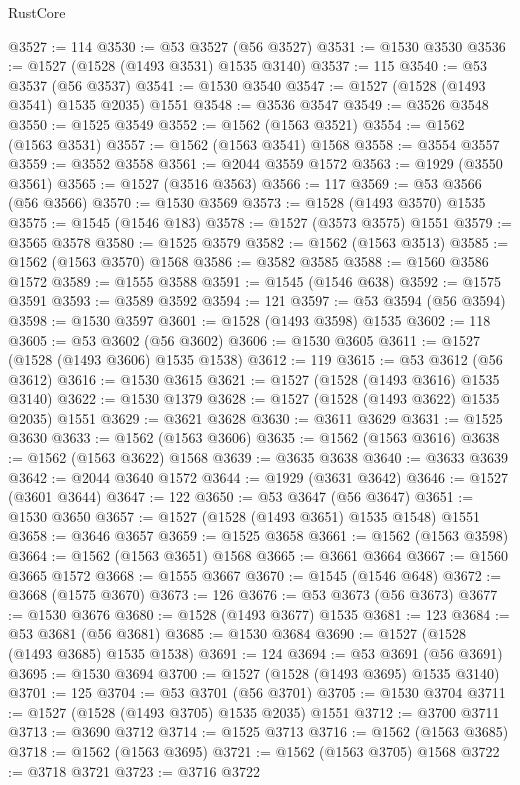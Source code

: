 \begin{lexlean}{RustCore}
\begin{coremodule}
@3527 := 114
@3530 := @53 @3527 (@56 @3527)
@3531 := @1530 @3530
@3536 := @1527 (@1528 (@1493 @3531) @1535 @3140)
@3537 := 115
@3540 := @53 @3537 (@56 @3537)
@3541 := @1530 @3540
@3547 := @1527 (@1528 (@1493 @3541) @1535 @2035) @1551
@3548 := @3536 @3547
@3549 := @3526 @3548
@3550 := @1525 @3549
@3552 := @1562 (@1563 @3521)
@3554 := @1562 (@1563 @3531)
@3557 := @1562 (@1563 @3541) @1568
@3558 := @3554 @3557
@3559 := @3552 @3558
@3561 := @2044 @3559 @1572
@3563 := @1929 (@3550 @3561)
@3565 := @1527 (@3516 @3563)
@3566 := 117
@3569 := @53 @3566 (@56 @3566)
@3570 := @1530 @3569
@3573 := @1528 (@1493 @3570) @1535
@3575 := @1545 (@1546 @183)
@3578 := @1527 (@3573 @3575) @1551
@3579 := @3565 @3578
@3580 := @1525 @3579
@3582 := @1562 (@1563 @3513)
@3585 := @1562 (@1563 @3570) @1568
@3586 := @3582 @3585
@3588 := @1560 @3586 @1572
@3589 := @1555 @3588
@3591 := @1545 (@1546 @638)
@3592 := @1575 @3591
@3593 := @3589 @3592
@3594 := 121
@3597 := @53 @3594 (@56 @3594)
@3598 := @1530 @3597
@3601 := @1528 (@1493 @3598) @1535
@3602 := 118
@3605 := @53 @3602 (@56 @3602)
@3606 := @1530 @3605
@3611 := @1527 (@1528 (@1493 @3606) @1535 @1538)
@3612 := 119
@3615 := @53 @3612 (@56 @3612)
@3616 := @1530 @3615
@3621 := @1527 (@1528 (@1493 @3616) @1535 @3140)
@3622 := @1530 @1379
@3628 := @1527 (@1528 (@1493 @3622) @1535 @2035) @1551
@3629 := @3621 @3628
@3630 := @3611 @3629
@3631 := @1525 @3630
@3633 := @1562 (@1563 @3606)
@3635 := @1562 (@1563 @3616)
@3638 := @1562 (@1563 @3622) @1568
@3639 := @3635 @3638
@3640 := @3633 @3639
@3642 := @2044 @3640 @1572
@3644 := @1929 (@3631 @3642)
@3646 := @1527 (@3601 @3644)
@3647 := 122
@3650 := @53 @3647 (@56 @3647)
@3651 := @1530 @3650
@3657 := @1527 (@1528 (@1493 @3651) @1535 @1548) @1551
@3658 := @3646 @3657
@3659 := @1525 @3658
@3661 := @1562 (@1563 @3598)
@3664 := @1562 (@1563 @3651) @1568
@3665 := @3661 @3664
@3667 := @1560 @3665 @1572
@3668 := @1555 @3667
@3670 := @1545 (@1546 @648)
@3672 := @3668 (@1575 @3670)
@3673 := 126
@3676 := @53 @3673 (@56 @3673)
@3677 := @1530 @3676
@3680 := @1528 (@1493 @3677) @1535
@3681 := 123
@3684 := @53 @3681 (@56 @3681)
@3685 := @1530 @3684
@3690 := @1527 (@1528 (@1493 @3685) @1535 @1538)
@3691 := 124
@3694 := @53 @3691 (@56 @3691)
@3695 := @1530 @3694
@3700 := @1527 (@1528 (@1493 @3695) @1535 @3140)
@3701 := 125
@3704 := @53 @3701 (@56 @3701)
@3705 := @1530 @3704
@3711 := @1527 (@1528 (@1493 @3705) @1535 @2035) @1551
@3712 := @3700 @3711
@3713 := @3690 @3712
@3714 := @1525 @3713
@3716 := @1562 (@1563 @3685)
@3718 := @1562 (@1563 @3695)
@3721 := @1562 (@1563 @3705) @1568
@3722 := @3718 @3721
@3723 := @3716 @3722

\end{coremodule}
\end{lexlean}
